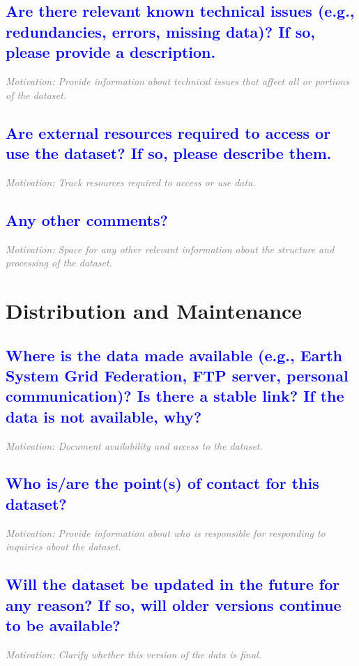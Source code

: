 \documentclass[letterpaper, 10 pt, transmag]{IEEEtran}
\begin{document}
\textcolor{blue}{\subsection{Are there relevant known technical issues (e.g., redundancies, errors, missing data)? If so, please provide a description.}}
\textcolor{gray}{\textit{Motivation: Provide information about technical issues that affect all or portions of the dataset.}}

\textcolor{blue}{\subsection{Are external resources required to access or use the dataset? If so, please describe them.}}
\textcolor{gray}{\textit{Motivation: Track resources required to access or use data.}}

\textcolor{blue}{\subsection{Any other comments?}}
\textcolor{gray}{\textit{Motivation: Space for any other relevant information about the structure and processing of the dataset.}}  
\vspace{10mm}

\section{Distribution and Maintenance}

\textcolor{blue}{\subsection{Where is the data made available (e.g., Earth System Grid Federation, FTP server, personal communication)? Is there a stable link? If the data is not available, why?}}
\textcolor{gray}{\textit{Motivation: Document availability and access to the dataset.}}

\textcolor{blue}{\subsection{Who is/are the point(s) of contact for this dataset?}}
\textcolor{gray}{\textit{Motivation: Provide information about who is responsible for responding to inquiries about the dataset.}}

\textcolor{blue}{\subsection{Will the dataset be updated in the future for any reason? If so, will older versions continue to be available?}}
\textcolor{gray}{\textit{Motivation: Clarify whether this version of the data is final.}}
\end{document}
